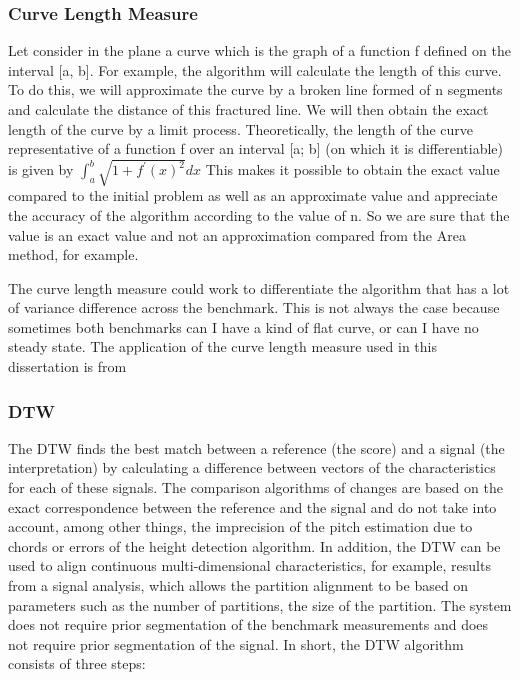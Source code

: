 \documentclass{article}
\begin{document}
\subsubsection{Curve Length Measure}


Let consider in the plane a curve \citep{moran1966measuring} which is the graph of a function f defined on the interval [a, b]. For example, the algorithm will calculate the length of this curve. To do this, we will approximate the curve by a broken line formed of n segments and calculate the distance of this fractured line. We will then obtain the exact length of the curve by a limit process.
Theoretically, the length of the curve representative of a function f over an interval [a; b] (on which it is differentiable) is given by $\int_{a}^{b} \sqrt{1+f^{\prime}(x)^{2}} d x$
This makes it possible to obtain the exact value compared to the initial problem as well as an approximate value and appreciate the accuracy of the algorithm according to the value of n. So we are sure that the value is an exact value and not an approximation compared from the Area method, for example.

The curve length measure could work to differentiate the algorithm that has a lot of variance difference across the benchmark. This is not always the case because sometimes both benchmarks can I have a kind of flat curve, or can I have no steady state.
The application of the curve length measure used in this dissertation is from \citep{jekel2019similarity}


\subsubsection{DTW}

 The DTW finds the best match between a reference (the score) and a signal (the interpretation) by calculating a difference between vectors of the characteristics for each of these signals. The comparison algorithms of changes are based on the exact correspondence between the reference and the signal and do not take into account, among other things, the imprecision of the pitch estimation due to chords or errors of the height detection algorithm. In addition, the DTW can be used to align continuous multi-dimensional characteristics, for example, results from a signal analysis, which allows the partition alignment to be based on parameters such as the number of partitions, the size of the partition.
The system does not require prior segmentation of the benchmark measurements and does not require prior segmentation of the
signal.
In short, the DTW algorithm consists of three steps:
\end{document}

